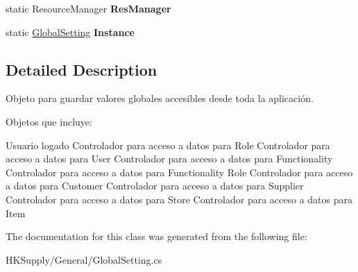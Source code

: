\begin{DoxyCompactItemize}
\item 
\mbox{\label{class_h_k_supply_1_1_general_1_1_global_setting_ad2628f5f55a5a8f640cd28aa425f968f}} 
static Resource\+Manager {\bfseries Res\+Manager}
\item 
\mbox{\label{class_h_k_supply_1_1_general_1_1_global_setting_afa2d235e79652e93864a33932863c1e2}} 
static \hyperlink{class_h_k_supply_1_1_general_1_1_global_setting}{Global\+Setting} {\bfseries Instance}
\end{DoxyCompactItemize}


\subsection{Detailed Description}
Objeto para guardar valores globales accesibles desde toda la aplicación. 

Objetos que incluye\+:
\begin{DoxyItemize}
\item Usuario logado Controlador para acceso a datos para Role Controlador para acceso a datos para User Controlador para acceso a datos para Functionality Controlador para acceso a datos para Functionality Role Controlador para acceso a datos para Customer Controlador para acceso a datos para Supplier Controlador para acceso a datos para Store Controlador para acceso a datos para Item 
\end{DoxyItemize}

The documentation for this class was generated from the following file\+:\begin{DoxyCompactItemize}
\item 
H\+K\+Supply/\+General/Global\+Setting.\+cs\end{DoxyCompactItemize}
